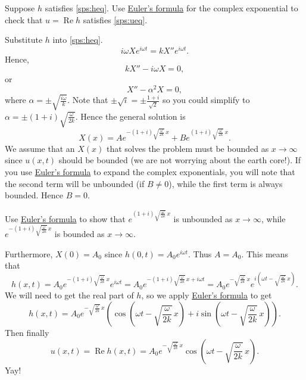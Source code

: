 \begin{exercise}
Suppose $h$ satisfies \eqref{sps:heq}.
Use \hyperref[eulersformula]{Euler's formula} for the complex exponential to
check that $u = \operatorname{Re} h$ satisfies \eqref{sps:ueq}.
\end{exercise}

Substitute $h$ into \eqref{sps:heq}.
\begin{equation*}
i\omega X e^{i\omega t} = k X'' e^{i \omega t} .
\end{equation*}
Hence,
\begin{equation*}
k X''  - i \omega X = 0 ,
\end{equation*}
or 
\begin{equation*}
X''  - \alpha^2 X = 0 ,
\end{equation*}
where $\alpha = \pm \sqrt{\frac{i\omega}{k}}$.  Note that $\pm \sqrt{i} = \pm
\frac{1+i}{\sqrt{2}}$ so you could simplify to
$\alpha = \pm (1+i)\sqrt{\frac{\omega}{2k}}$.
Hence the general solution is
\begin{equation*}
X(x) = A e^{-(1+i)\sqrt{\frac{\omega}{2k}} \, x}
+ B e^{(1+i)\sqrt{\frac{\omega}{2k}} \, x} .
\end{equation*}
We assume that an $X(x)$ that solves the problem must be bounded as $x \to
\infty$ since $u(x,t)$ should be bounded (we are not worrying about the earth
core!).
If you use \hyperref[eulersformula]{Euler's formula} to expand the complex exponentials, you will
note that the second term will be unbounded (if $B \not = 0$),
while the first term is always bounded.  Hence $B=0$.

\begin{exercise}
Use \hyperref[eulersformula]{Euler's formula} to show that
$e^{(1+i)\sqrt{\frac{\omega}{2k}} \, x}$ is unbounded as $x \to \infty$,
while $e^{-(1+i)\sqrt{\frac{\omega}{2k}} \, x}$ is bounded
as $x \to \infty$.
\end{exercise}

Furthermore, $X(0) = A_0$ since $h(0,t) = A_0 e^{i \omega t}$.
Thus $A=A_0$.  This means that
\begin{equation*}
h(x,t) = A_0 e^{-(1+i)\sqrt{\frac{\omega}{2k}} \, x} e^{i \omega t}
=
A_0 e^{-(1+i)\sqrt{\frac{\omega}{2k}} \, x + i \omega t}
=
A_0 e^{-\sqrt{\frac{\omega}{2k}} \, x}
e^{i(\omega t - \sqrt{\frac{\omega}{2k}} \, x)} .
\end{equation*}
We will need to get the real part of $h$, so
we apply \hyperref[eulersformula]{Euler's formula} to get
\begin{equation*}
h(x,t) =
A_0 e^{-\sqrt{\frac{\omega}{2k}} \, x}
\left(\cos \left(\omega t - \sqrt{\frac{\omega}{2k}}\, x\right) + 
i \sin \left(\omega t - \sqrt{\frac{\omega}{2k}}\, x\right) \right) .
\end{equation*}
Then finally
\begin{equation*}
u(x,t) = \operatorname{Re} h(x,t) =
A_0 e^{-\sqrt{\frac{\omega}{2k}}\, x}
\cos \left(\omega t - \sqrt{\frac{\omega}{2k}}\, x\right) .
\end{equation*}
Yay!

